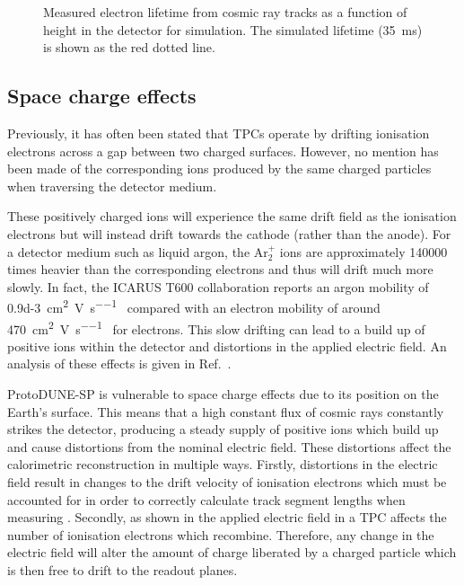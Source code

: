 \begin{figure}[h] 
	\begin{adjustbox}{max totalsize=.6\linewidth, center}
		
	\end{adjustbox}
	\caption[Measured electron lifetime as a function of height within the detector in simulation]{Measured electron lifetime from cosmic ray tracks as a function of height in the detector for simulation. The simulated lifetime (\SI{35}{\ms}) is shown as the red dotted line.}
	\label{fig:lifetimeNoSCE}
\end{figure}

\subsection{Space charge effects}
\label{sec:pdune_calibration:lifetime:sce}

Previously, it has often been stated that TPCs operate by drifting ionisation electrons across a gap between two charged surfaces.
However, no mention has been made of the corresponding ions produced by the same charged particles when traversing the detector medium.

These positively charged ions will experience the same drift field as the ionisation electrons but will instead drift towards the cathode (rather than the anode).
For a detector medium such as liquid argon, the $\text{Ar}_{2}^{+}$ ions are approximately \num{140000} times heavier than the corresponding electrons and thus will drift much more slowly.
In fact, the ICARUS T600 collaboration reports an argon mobility of \SI{0.9d-3}{\cm\squared\per\volt\per\second}~\cite{icarusSpaceCharge} compared with an electron mobility of around \SI{470}{\cm\squared\per\volt\per\second}~\cite{electronMobility} for electrons.
This slow drifting can lead to a build up of positive ions within the detector and distortions in the applied electric field. 
An analysis of these effects is given in Ref.~\cite{spaceCharge2021}.

ProtoDUNE-SP is vulnerable to space charge effects due to its position on the Earth's surface.
This means that a high constant flux of cosmic rays constantly strikes the detector, producing a steady supply of positive ions which build up and cause distortions from the nominal electric field.
These distortions affect the calorimetric reconstruction in multiple ways.
Firstly, distortions in the electric field result in changes to the drift velocity of ionisation electrons which must be accounted for in order to correctly calculate track segment lengths when measuring \dqdx.
Secondly, as shown in  the applied electric field in a TPC affects the number of ionisation electrons which recombine. 
Therefore, any change in the electric field will alter the amount of charge liberated by a charged particle which is then free to drift to the readout planes.

